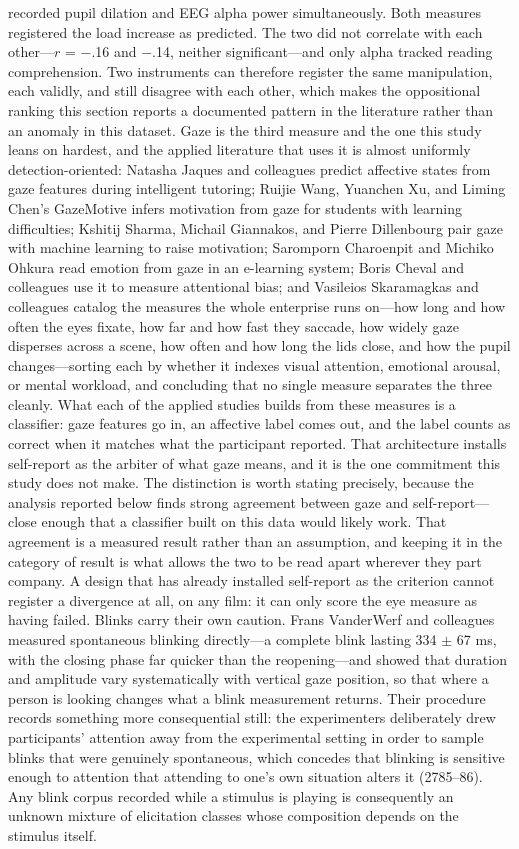 recorded pupil dilation and EEG alpha power simultaneously. Both measures registered the load
increase as predicted. The two did not correlate with each other---$r$ = $-$.16 and $-$.14,
neither significant---and only alpha tracked reading comprehension. Two instruments can
therefore register the same manipulation, each validly, and still disagree with each other,
which makes the oppositional ranking this section reports a documented pattern in the
literature rather than an anomaly in this dataset. Gaze is the third measure and the one this
study leans on hardest, and the applied literature that uses it is almost uniformly
detection-oriented: Natasha Jaques and colleagues predict affective states from gaze features
during intelligent tutoring; Ruijie Wang, Yuanchen Xu, and Liming Chen's GazeMotive infers
motivation from gaze for students with learning difficulties; Kshitij Sharma, Michail
Giannakos, and Pierre Dillenbourg pair gaze with machine learning to raise motivation;
Saromporn Charoenpit and Michiko Ohkura read emotion from gaze in an e-learning system; Boris
Cheval and colleagues use it to measure attentional bias; and Vasileios Skaramagkas and
colleagues catalog the measures the whole enterprise runs on---how long and how often the eyes
fixate, how far and how fast they saccade, how widely gaze disperses across a scene, how often
and how long the lids close, and how the pupil changes---sorting each by whether it indexes
visual attention, emotional arousal, or mental workload, and concluding that no single measure
separates the three cleanly. What each of the applied studies builds from these measures is a
classifier: gaze features go in, an affective label comes out, and the label counts as correct
when it matches what the participant reported. That architecture installs self-report as the
arbiter of what gaze means, and it is the one commitment this study does not make. The
distinction is worth stating precisely, because the analysis reported below finds strong
agreement between gaze and self-report---close enough that a classifier built on this data
would likely work. That agreement is a measured result rather than an assumption, and keeping
it in the category of result is what allows the two to be read apart wherever they part
company. A design that has already installed self-report as the criterion cannot register a
divergence at all, on any film: it can only score the eye measure as having failed.
Blinks carry their own caution. Frans VanderWerf and colleagues measured spontaneous blinking
directly---a complete blink lasting 334 $\pm$ 67 ms, with the closing phase far quicker than
the reopening---and showed that duration and amplitude vary systematically with vertical gaze
position, so that where a person is looking changes what a blink measurement returns. Their
procedure records something more consequential still: the experimenters deliberately drew
participants' attention away from the experimental setting in order to sample blinks that were
genuinely spontaneous, which concedes that blinking is sensitive enough to attention that
attending to one's own situation alters it (2785--86). Any blink corpus recorded while a
stimulus is playing is consequently an unknown mixture of elicitation classes whose
composition depends on the stimulus itself.

